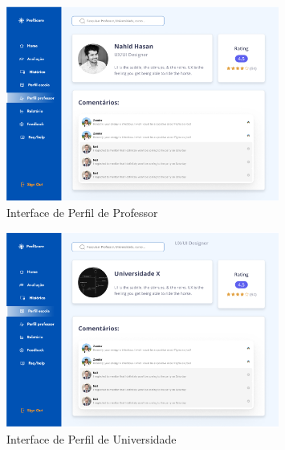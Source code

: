\documentclass[12pt]{article}
\begin{document}
\begin{figure}[H] %
  \centering
  \includegraphics[width=0.8\textwidth]{interfaces/i11-perfil-prof.png}
  \caption{Interface de Perfil de Professor}
  \label{fig:i11-perfil-prof}
\end{figure}

\begin{figure}[H] %
  \centering
  \includegraphics[width=0.8\textwidth]{interfaces/i12-perfil-univ.png}
  \caption{Interface de Perfil de Universidade}
  \label{fig:i12-perfil-univ}
\end{figure}
\end{document}
